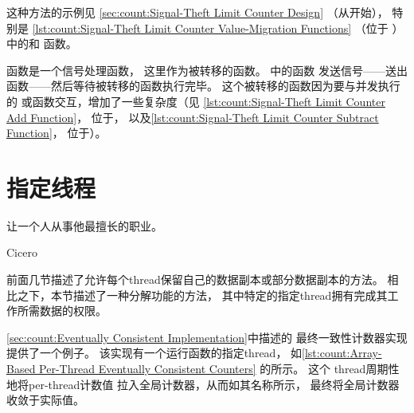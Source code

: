 这种方法的示例见
\cref{sec:count:Signal-Theft Limit Counter Design}
（从开始），
特别是
\cref{lst:count:Signal-Theft Limit Counter Value-Migration Functions}
（位于
）
中的和
函数。

函数是一个信号处理函数，
这里作为被转移的函数。
中的函数
发送信号——送出函数——然后等待被转移的函数执行完毕。
这个被转移的函数因为要与并发执行的
或函数交互，增加了一些复杂度（见
\cref{lst:count:Signal-Theft Limit Counter Add Function}，
位于，
以及\cref{lst:count:Signal-Theft Limit Counter Subtract Function}，
位于）。

\QuickQuizEnd

\section{指定线程}
\label{sec:owned:Designated Thread}
%
\epigraph{让一个人从事他最擅长的职业。}
	 {Cicero}

前面几节描述了允许每个thread保留自己的数据副本或部分数据副本的方法。
相比之下，本节描述了一种分解功能的方法，
其中特定的指定thread拥有完成其工作所需数据的权限。
\begin{fcvref}
\cref{sec:count:Eventually Consistent Implementation}中描述的
最终一致性计数器实现提供了一个例子。
该实现有一个运行函数的指定thread，
如\cref{lst:count:Array-Based Per-Thread Eventually Consistent Counters}
的所示。
这个 thread周期性地将per-thread计数值
拉入全局计数器，从而如其名称所示，
最终将全局计数器收敛于实际值。
\end{fcvref}

